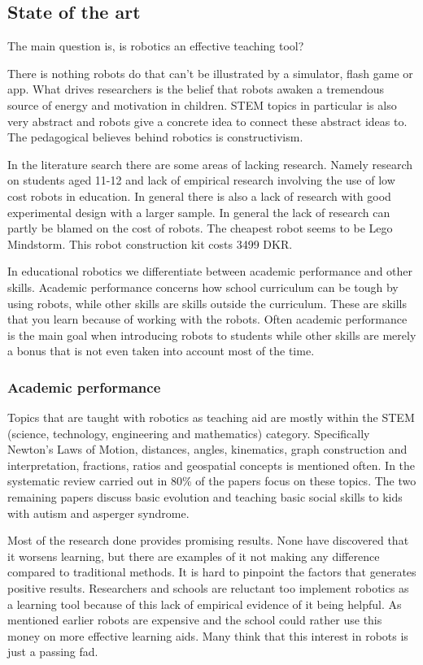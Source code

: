 \subsection*{State of the art}
The main question is, is robotics an effective teaching tool?

\bigskip\noindent
There is nothing robots do that can't be illustrated by a simulator, flash game or app. What drives researchers is the belief that robots awaken a tremendous source of energy and motivation in children. STEM topics in particular is also very abstract and robots give a concrete idea to connect these abstract ideas to. The pedagogical believes behind robotics is constructivism. 

\bigskip\noindent
In the literature search there are some areas of lacking research. Namely research on students aged 11-12 and lack of empirical research involving the use of low cost robots in education. In general there is also a lack of research with good experimental design with a larger sample. In general the lack of research can partly be blamed on the cost of robots. The cheapest robot seems to be Lego Mindstorm. This robot construction kit costs 3499 DKR. 

\bigskip\noindent
In educational robotics we differentiate between academic performance and other skills. Academic performance concerns how school curriculum can be tough by using robots, while other skills are skills outside the curriculum. These are skills that you learn because of working with the robots. Often academic performance is the main goal when introducing robots to students while other skills are merely a bonus that is not even taken into account most of the time. 

\subsubsection*{Academic performance}

Topics that are taught with robotics as teaching aid are mostly within the STEM (science, technology, engineering and mathematics) category. Specifically Newton's Laws of Motion, distances, angles, kinematics, graph construction and interpretation, fractions, ratios and geospatial concepts is mentioned often. In the systematic review carried out in \cite{Benitti2012978} 80\% of the papers focus on these topics. The two remaining papers discuss basic evolution and teaching basic social skills to kids with autism and asperger syndrome. 

\bigskip\noindent
Most of the research done provides promising results. None have discovered that it worsens learning, but there are examples of it not making any difference compared to traditional methods. It is hard to pinpoint the factors that generates positive results. Researchers and schools are reluctant too implement robotics as a learning tool because of this lack of empirical evidence of it being helpful. As mentioned earlier robots are expensive and the school could rather use this money on more effective learning aids. Many think that this interest in robots is just a passing fad. 

